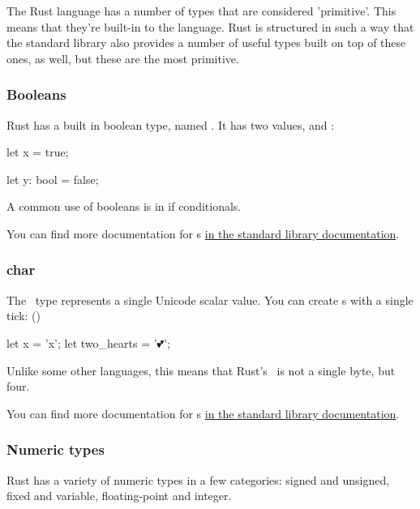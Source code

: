 The Rust language has a number of types that are considered 'primitive'. This means that they're built-in to the language. Rust is
structured in such a way that the standard library also provides a number of useful types built on top of these ones, as well, but 
these are the most primitive.

\subsubsection*{Booleans}

Rust has a built in boolean type, named . It has two values,  and :

\begin{rustc}
let x = true;

let y: bool = false;
\end{rustc}

A common use of booleans is in if conditionals.

\blank

You can find more documentation for s \href{https://doc.rust-lang.org/std/primitive.bool.html}{in the standard library
documentation}.

\subsubsection*{char}

The \varchar\ type represents a single Unicode scalar value. You can create \varchar s with a single tick: ()

\begin{rustc}
let x = 'x';
let two_hearts = '💕';
\end{rustc}

Unlike some other languages, this means that Rust's \varchar\ is not a single byte, but four.

\blank

You can find more documentation for \varchar s \href{https://doc.rust-lang.org/std/primitive.char.html}{in the standard library
documentation}.

\subsubsection*{Numeric types}

Rust has a variety of numeric types in a few categories: signed and unsigned, fixed and variable, floating-point and integer.

